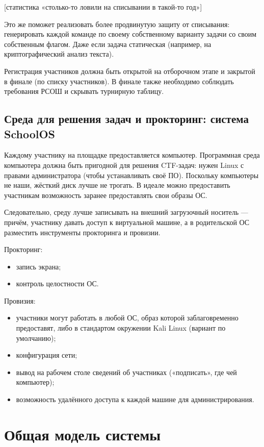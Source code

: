 [статистика «столько-то ловили на списывании в такой-то год»]

Это же поможет реализовать более продвинутую защиту от списывания: генерировать каждой команде по своему собственному варианту задачи со своим собственным флагом. Даже если задача статическая (например, на криптографический анализ текста).

Регистрация участников должна быть открытой на отборочном этапе и закрытой в финале (по списку участников). В финале также необходимо соблюдать требования РСОШ и скрывать турнирную таблицу.


\subsection{Среда для решения задач и прокторинг: система SchoolOS}

Каждому участнику на площадке предоставляется компьютер. Программная среда компьютера должна быть пригодной для решения CTF-задач: нужен Linux с правами администратора (чтобы устанавливать своё ПО). Поскольку компьютеры не наши, жёсткий диск лучше не трогать. В идеале можно предоставить участникам возможность заранее предоставлять свои образы ОС.

Следовательно, среду лучше записывать на внешний загрузочный носитель — причём, участнику давать доступ к виртуальной машине, а в родительской ОС разместить инструменты прокторинга и провизии.

Прокторинг:
\begin{itemize}
\item
  запись экрана;
\item
  контроль целостности ОС.
\end{itemize}

Провизия:
\begin{itemize}
\item
  участники могут работать в любой ОС, образ которой заблаговременно предоставят, либо в стандартом окружении Kali Linux (вариант по умолчанию);
\item
  конфигурация сети;
\item
  вывод на рабочем столе сведений об участниках («подписать», где чей компьютер);
\item
  возможность удалённого доступа к каждой машине для администрирования.
\end{itemize}


\section{Общая модель системы}

